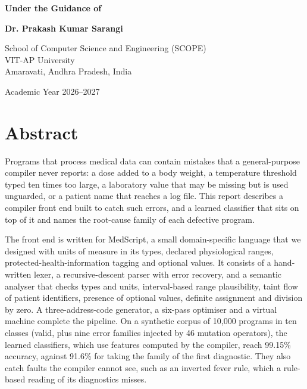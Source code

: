\documentclass[12pt,a4paper]{article}
\newcommand{\NProg}{10{,}000}
\newcommand{\RuleFirstAcc}{91.6}
\newcommand{\RFAcc}{99.15}
\begin{document}
\begin{titlepage}
\begin{center}
\vspace{1.0cm}

\textbf{Under the Guidance of}

\vspace{0.3cm}

\textbf{Dr. Prakash Kumar Sarangi}

\vspace{1.0cm}

{\large
School of Computer Science and Engineering (SCOPE)\\
VIT-AP University\\
Amaravati, Andhra Pradesh, India
}

\vspace{0.4cm}

{\large
Academic Year 2026--2027
}

\end{center}
\end{titlepage}

\section*{Abstract}

Programs that process medical data can contain mistakes that a general-purpose compiler never reports: a dose added to a
body weight, a temperature threshold typed ten times too large, a laboratory value that may be missing but is used
unguarded, or a patient name that reaches a log file. This report describes a compiler front end built to catch such
errors, and a learned classifier that sits on top of it and names the root-cause family of each defective program.

The front end is written for MedScript, a small domain-specific language that we designed with units of measure in its types,
declared physiological ranges, protected-health-information tagging and optional values. It consists of a hand-written lexer,
a recursive-descent parser with error recovery, and a semantic analyser that checks types and units, interval-based range
plausibility, taint flow of patient identifiers, presence of optional values, definite assignment and division by zero. A
three-address-code generator, a six-pass optimiser and a virtual machine complete the pipeline. On a synthetic corpus of
\NProg{} programs in ten classes (valid, plus nine error families injected by 46 mutation operators), the learned
classifiers, which use features computed by the compiler, reach \RFAcc\% accuracy, against \RuleFirstAcc\% for taking the family of the first
diagnostic. They also catch faults the compiler cannot see, such as an inverted fever rule, which a rule-based reading of its diagnostics misses.
\end{document}
